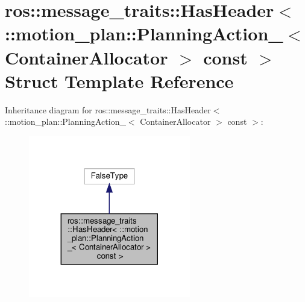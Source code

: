 \hypertarget{structros_1_1message__traits_1_1HasHeader_3_01_1_1motion__plan_1_1PlanningAction___3_01ContainerAllocator_01_4_01const_01_4}{}\section{ros\+:\+:message\+\_\+traits\+:\+:Has\+Header$<$ \+:\+:motion\+\_\+plan\+:\+:Planning\+Action\+\_\+$<$ Container\+Allocator $>$ const $>$ Struct Template Reference}
\label{structros_1_1message__traits_1_1HasHeader_3_01_1_1motion__plan_1_1PlanningAction___3_01ContainerAllocator_01_4_01const_01_4}


Inheritance diagram for ros\+:\+:message\+\_\+traits\+:\+:Has\+Header$<$ \+:\+:motion\+\_\+plan\+:\+:Planning\+Action\+\_\+$<$ Container\+Allocator $>$ const $>$\+:
\nopagebreak
\begin{figure}[H]
\begin{center}
\leavevmode
\includegraphics[width=200pt]{structros_1_1message__traits_1_1HasHeader_3_01_1_1motion__plan_1_1PlanningAction___3_01Container38c0fd6563b2b2a243ae5b91955f3a16}
\end{center}
\end{figure}


